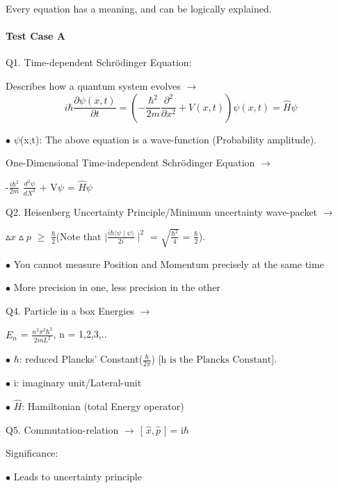 \documentclass[a4paper, 10pt, onepage]{elegantbook}
\begin{document}
{Every equation has a meaning, and can be logically explained.

\paragraph{Test Case A}
\label{para:Test Case A}
\noindent

Q1. Time-dependent Schr\"odinger Equation: 
  
Describes how a quantum system evolves $\longrightarrow$
\begin{equation}
i \hbar \frac{\partial \psi(x,t)}{\partial t} = \left( -\frac{\hbar^2}{2m} \frac{ \partial^2}{ \partial x^2} + V(x,t) 
\right) \psi(x,t) = \hat {H} \psi
\end{equation}


   
$\bullet$ $\psi$(x,t): The above equation is a wave-function (Probability amplitude).  

One-Dimensional Time-independent Schr\"odinger Equation $\longrightarrow$ 

-$\frac{i \hbar^2}{2m}$ $\frac{d^2 \psi}{d {X}^2}$ + V$\psi$ = $\hat {H} \psi$  

Q2. Heisenberg Uncertainty Principle/Minimum uncertainty wave-packet $\longrightarrow$ 

$\vartriangle{x} \vartriangle{p}$ $\geq$ $\frac{\hbar}{2}$(Note that $| \frac{i \hbar \langle \psi \mid\psi 
\rangle}{2i} \mid^2$ = $ \sqrt{\frac{\hbar^2}{4}}$ = $\frac{\hbar}{2}$). 

$\bullet$ You cannot measure Position and Momentum precisely at the same time 
 
$\bullet$ More precision in one, less precision in the other 

Q4. Particle in a box Energies $\longrightarrow$ 

$E_n$ = $\frac{n^2 \pi^2 \hbar^2}{{2m}{L^2}}$, n = 1,2,3,..  
    
$\bullet$ $\hbar$: reduced Plancks' Constant($\frac{\hbar}{2 \pi}$) [$\text{h is the Plancks Constant}$].  
  
$\bullet$ i: imaginary unit/Lateral-unit  
      
$\bullet$ $\hat {H}$: Hamiltonian (total Energy operator)  

Q5. Commutation-relation $\longrightarrow$ [ $\hat {x}, \hat {p}$ ] = i$\hbar$ 

Significance: 

$\bullet$ Leads to uncertainty principle  

}
\end{document}
